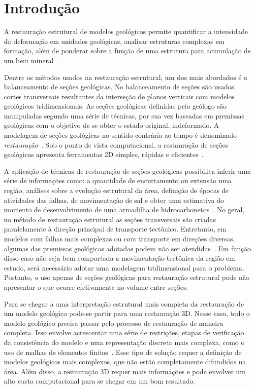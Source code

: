 
\chapter{Introdução}

A restauração estrutural de modelos geológicos permite quantificar a intensidade da deformação em unidades geológicas, analisar estruturas complexas em formação, além de ponderar sobre a função de uma estrutura para acumulação de um bem mineral~\cite{GarciaTese}.

Dentre os métodos usados na restauração estrutural, um dos mais abordados é o balanceamento de seções geológicas. No balanceamento de seções são usados cortes transversais resultantes da interseção de planos verticais com modelos geológicos tridimensionais. As seções geológicas definidas pelo geólogo são manipuladas segundo uma série de técnicas, por sua vez baseadas em premissas geológicas com o objetivo de se obter o estado original, indeformado. A modelagem de seções geológicas no sentido contrário ao tempo é denominado \emph{restauração}~\cite{Fossen}. Sob o ponto de vista computacional, a restauração de seções geológicas apresenta ferramentas 2D simples, rápidas e eficientes~\cite{GarciaTese}.

A aplicação de técnicas de restauração de seções geológicas possibilita inferir uma série de informações como: a quantidade de encurtamento ou extensão uma região, análises sobre a evolução estrutural da área, definição de épocas de atividades das falhas, de movimentação de sal e obter uma estimativa do momento de desenvolvimento de uma armadilha de hidrocarbonetos~\cite{DURANDRIARD-3D, Guedes}. No geral, no método de restauração estrutural as seções transversais são criadas paralelamente à direção principal de transporte tectônico. Entretanto, em modelos com falhas mais complexas ou com transporte em direções diversas, algumas das premissas geológicas adotadas podem não ser atendidas~\cite{GarciaTese}. Em função disso caso não seja bem comportada a movimentação tectônica da região em estudo, será necessário adotar uma modelagem tridimensional para o problema. Portanto, o uso apenas de seções geológicas para restauração estrutural pode não apresentar o que ocorre efetivamente no volume entre seções.

Para se chegar a uma interpretação estrutural mais completa da restauração de um modelo geológico pode-se partir para uma restauração 3D. Nesse caso, todo o modelo geológico precisa passar pelo processo de restauração de maneira completa. Isso envolve acrescentar uma série de restrições, etapas de verificação da consistência do modelo e uma representação discreta mais complexa, como o uso de malhas de elementos finitos~\cite{DURANDRIARD2010441}. Esse tipo de solução requer a definição de modelos geológicos mais complexos, que não estão completamente difundidos na área. Além disso, a restauração 3D requer mais informações e pode envolver um alto custo computacional para se chegar em um bom resultado.

